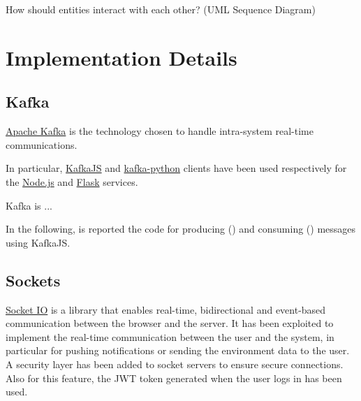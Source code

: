 \documentclass{scrartcl}
\begin{document}
    How should entities interact with each other?
%
    (UML Sequence Diagram)

    \section{Implementation Details}

    \subsection{Kafka}

    \href{https://kafka.apache.org}{Apache Kafka} is the technology chosen to handle intra-system real-time communications.

    In particular, \href{https://kafka.js.org}{KafkaJS} and \href{https://kafka-python.readthedocs.io/en/master/}{kafka-python} clients
    have been used respectively for the \href{https://nodejs.org/en}{Node.js} and \href{https://flask.palletsprojects.com/en/3.0.x/}{Flask} services.

    Kafka is ...

    In the following, is reported the code for producing () and consuming () messages using KafkaJS.

    

    

    \subsection{Sockets}
    \href{https://socket.io/}{Socket IO} is a library that enables real-time, bidirectional and event-based communication between the browser and the server.
    It has been exploited to implement the real-time communication between the user and the system, in particular for pushing notifications or sending the environment data to the user.
    A security layer has been added to socket servers to ensure secure connections.
    Also for this feature, the JWT token generated when the user logs in has been used.

    
\end{document}
